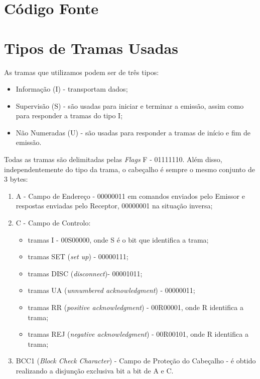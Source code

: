 \documentclass[11pt,a4paper,reqno]{report}
\numberwithin{equation}{section}
\begin{document}
\begin{appendices}

\chapter{Código Fonte}












\chapter{Tipos de Tramas Usadas}
\label{tramas}

As tramas que utilizamos podem ser de três tipos:
\begin{itemize}
	\item Informação (I) - transportam dados;
	\item Supervisão (S) - são usadas para iniciar e terminar a emissão, assim como para responder a tramas do tipo I;
	\item Não Numeradas (U) - são usadas para responder a tramas de início e fim de emissão.
\end{itemize}

Todas as tramas são delimitadas pelas \emph{Flags} F - 01111110. Além disso, independentemente do tipo da trama, o cabeçalho é sempre o mesmo conjunto de 3 bytes:
\begin{enumerate}
	\item A - Campo de Endereço - 00000011 em comandos enviados pelo Emissor e respostas enviadas pelo Receptor, 00000001 na situação inversa;
	\item C - Campo de Controlo:
		\begin{itemize}
			\item tramas I - 00S00000, onde S é o bit que identifica a trama;
			\item tramas SET (\emph{set up}) - 00000111;
			\item tramas DISC (\emph{disconnect})- 00001011;
			\item tramas UA (\emph{unnumbered acknowledgment}) - 00000011;
			\item tramas RR (\emph{positive acknowledgment}) - 00R00001, onde R identifica a trama;
			\item tramas REJ (\emph{negative acknowledgment}) - 00R00101, onde R identifica a trama;
		\end{itemize}
	\item BCC1 (\emph{Block Check Character}) - Campo de Proteção do Cabeçalho - é obtido realizando a disjunção exclusiva bit a bit de A e C.
\end{enumerate} 


\end{appendices}
\end{document}
